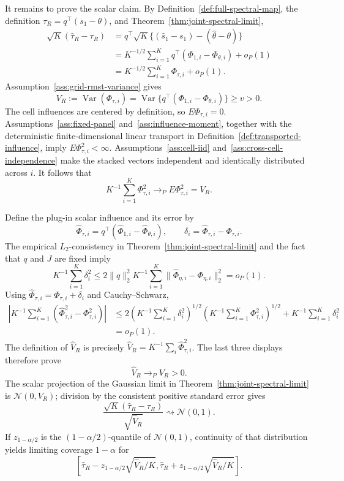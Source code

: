It remains to prove the scalar claim.  By Definition~\ref{def:full-spectral-map}, the definition \(\tau_R=q^\top(s_1-\theta)\), and Theorem~\ref{thm:joint-spectral-limit},
\[
\begin{aligned}
 \sqrt K(\widehat\tau_R-\tau_R)
 &=q^\top\sqrt K\{(\widehat s_1-s_1)-(\widehat\theta-\theta)\}\\
 &=K^{-1/2}\sum_{i=1}^Kq^\top(\Phi_{1,i}-\Phi_{\theta,i})+o_P(1)\\
 &=K^{-1/2}\sum_{i=1}^K\Phi_{\tau,i}+o_P(1).
\end{aligned}
\]
Assumption~\ref{ass:grid-rmst-variance} gives
\[
 V_R:=\operatorname{Var}(\Phi_{\tau,i})
 =\operatorname{Var}\{q^\top(\Phi_{1,i}-\Phi_{\theta,i})\}
 \ge v>0.
\]
The cell influences are centered by definition, so \(E\Phi_{\tau,i}=0\).  Assumptions~\ref{ass:fixed-panel} and~\ref{ass:influence-moment}, together with the deterministic finite-dimensional linear transport in Definition~\ref{def:transported-influence}, imply \(E\Phi_{\tau,i}^2<\infty\).  Assumptions~\ref{ass:cell-iid} and~\ref{ass:cross-cell-independence} make the stacked vectors independent and identically distributed across \(i\).  It follows that
\[
 K^{-1}\sum_{i=1}^K\Phi_{\tau,i}^2\longrightarrow_P
 E\Phi_{\tau,i}^2=V_R.
\]

Define the plug-in scalar influence and its error by
\[
 \widehat\Phi_{\tau,i}
 =q^\top(\widehat\Phi_{1,i}-\widehat\Phi_{\theta,i}),
 \qquad
 \delta_i=\widehat\Phi_{\tau,i}-\Phi_{\tau,i}.
\]
The empirical \(L_2\)-consistency in Theorem~\ref{thm:joint-spectral-limit} and the fact that \(q\) and \(J\) are fixed imply
\[
 K^{-1}\sum_{i=1}^K\delta_i^2
 \le 2\|q\|_2^2 K^{-1}\sum_{i=1}^K
 \|\widehat\Phi_{\eta,i}-\Phi_{\eta,i}\|_2^2
 =o_P(1).
\]
Using \(\widehat\Phi_{\tau,i}=\Phi_{\tau,i}+\delta_i\) and Cauchy--Schwarz,
\[
\begin{aligned}
 \left|K^{-1}\sum_{i=1}^K
   (\widehat\Phi_{\tau,i}^2-\Phi_{\tau,i}^2)\right|
 &\le 2\left(K^{-1}\sum_{i=1}^K\delta_i^2\right)^{1/2}
          \left(K^{-1}\sum_{i=1}^K\Phi_{\tau,i}^2\right)^{1/2}
       +K^{-1}\sum_{i=1}^K\delta_i^2\\
 &=o_P(1).
\end{aligned}
\]
The definition of \(\widehat V_R\) is precisely
\(\widehat V_R=K^{-1}\sum_i\widehat\Phi_{\tau,i}^2\).  The last three displays therefore prove
\[
 \widehat V_R\longrightarrow_PV_R>0.
\]
The scalar projection of the Gaussian limit in Theorem~\ref{thm:joint-spectral-limit} is \(\mathcal N(0,V_R)\); division by the consistent positive standard error gives
\[
 \frac{\sqrt K(\widehat\tau_R-\tau_R)}{\sqrt{\widehat V_R}}
 \rightsquigarrow\mathcal N(0,1).
\]
If \(z_{1-\alpha/2}\) is the \((1-\alpha/2)\)-quantile of \(\mathcal N(0,1)\), continuity of that distribution yields limiting coverage \(1-\alpha\) for
\[
 \left[
 \widehat\tau_R-z_{1-\alpha/2}\sqrt{\widehat V_R/K},
 \widehat\tau_R+z_{1-\alpha/2}\sqrt{\widehat V_R/K}
 \right].
\]

